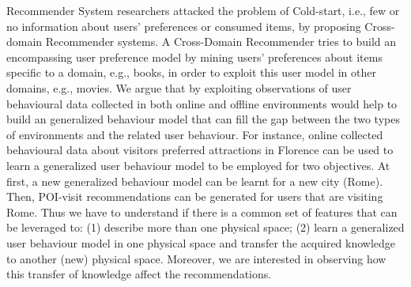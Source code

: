 	Recommender System researchers attacked the problem of Cold-start, i.e., few or no information about users' preferences or consumed items, by proposing Cross-domain Recommender systems. A Cross-Domain Recommender tries to build an encompassing user preference model by mining users' preferences about items specific to a domain, e.g., books, in order to exploit this user model in other domains, e.g., movies.
	We argue that by exploiting observations of user behavioural data collected in both online and offline environments would help to build an generalized behaviour model that can fill the gap between the two types of environments and the related user behaviour.
	For instance, online collected behavioural data about visitors preferred attractions in Florence can be used to learn a generalized user behaviour model to be employed for two objectives. At first, a new generalized behaviour model can be learnt for a new city (Rome). Then, POI-visit recommendations can be generated for users that are visiting Rome.
	Thus we have to understand if there is a common set of features that can be leveraged to: (1) describe more than one physical space; (2) learn a generalized user behaviour model in one physical space and transfer the acquired knowledge to another (new) physical space. Moreover, we are interested in observing how this transfer of knowledge affect the recommendations.\newline
	

